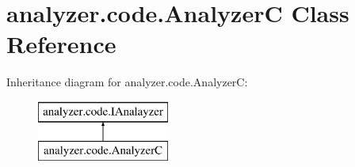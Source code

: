 \hypertarget{classanalyzer_1_1code_1_1AnalyzerC}{}\section{analyzer.\+code.\+AnalyzerC Class Reference}
\label{classanalyzer_1_1code_1_1AnalyzerC}
Inheritance diagram for analyzer.\+code.\+AnalyzerC\+:\begin{figure}[H]
\begin{center}
\leavevmode
\includegraphics[height=2.000000cm]{classanalyzer_1_1code_1_1AnalyzerC}
\end{center}
\end{figure}
